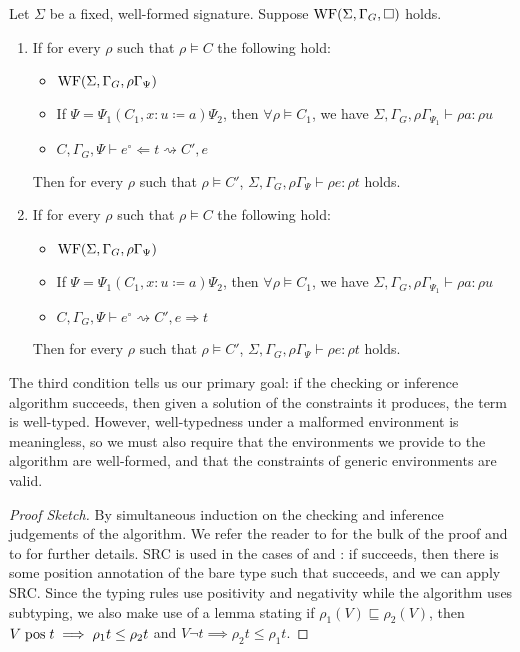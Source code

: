 \begin{theorem}
  Let $\Sigma$ be a fixed, well-formed signature.
  Suppose $\textrm{WF}(\Sigma, \Gamma_G, \square)$ holds.
  \begin{enumerate}
    \item If for every $\rho$ such that $\rho \vDash C$ the following hold:
      \begin{itemize}
        \item $\textrm{WF}(\Sigma, \Gamma_G, \rho\Gamma_\Psi)$
        \item If $\Psi = \Psi_1 (C_1, x : u \coloneqq a) \Psi_2$, then $\forall \rho \vDash C_1$, we have $\Sigma, \Gamma_G, \rho \Gamma_{\Psi_1} \vdash \rho a : \rho u$
        \item $C, \Gamma_G, \Psi \vdash e^\circ \Leftarrow t \rightsquigarrow C', e$
      \end{itemize}
      Then for every $\rho$ such that $\rho \vDash C'$, $\Sigma, \Gamma_G, \rho\Gamma_\Psi \vdash \rho e : \rho t$ holds.
    \item If for every $\rho$ such that $\rho \vDash C$ the following hold:
      \begin{itemize}
        \item $\textrm{WF}(\Sigma, \Gamma_G, \rho\Gamma_\Psi)$
        \item If $\Psi = \Psi_1 (C_1, x : u \coloneqq a) \Psi_2$, then $\forall \rho \vDash C_1$, we have $\Sigma, \Gamma_G, \rho \Gamma_{\Psi_1} \vdash \rho a : \rho u$
        \item $C, \Gamma_G, \Psi \vdash e^\circ \rightsquigarrow C', e \Rightarrow t$
      \end{itemize}
      Then for every $\rho$ such that $\rho \vDash C'$, $\Sigma, \Gamma_G, \rho\Gamma_\Psi \vdash \rho e : \rho t$ holds.
  \end{enumerate}
\end{theorem}

The third condition tells us our primary goal: if the checking or inference algorithm succeeds, then given a solution of the constraints it produces, the term is well-typed.
However, well-typedness under a malformed environment is meaningless, so we must also require that the environments we provide to the algorithm are well-formed, and that the constraints of generic environments are valid.

\begin{proof}[Proof Sketch]
  By simultaneous induction on the checking and inference judgements of the algorithm.
  We refer the reader to \anotherpdf for the bulk of the proof and to \citet{f-hat, cc-hat-omega} for further details.
  SRC is used in the cases of  and : if \RecCheckLoop succeeds, then there is some position annotation of the bare \cofixpoint type such that \RecCheck succeeds, and we can apply SRC.
  Since the typing rules use positivity and negativity while the algorithm uses subtyping, we also make use of a lemma stating if $\rho_1(V) \sqsubseteq \rho_2(V)$, then $V \mathrel{\text{pos}} t \implies \rho_1 t \leq \rho_2 t$ and $V \neg t \implies \rho_2 t \leq \rho_1 t$.
\end{proof}

